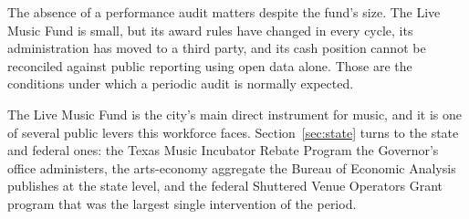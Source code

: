 The absence of a performance audit matters despite the fund's size. The
Live Music Fund is small, but its award rules have
changed in every cycle, its administration has moved to a third party,
and its cash position cannot be reconciled against public reporting
using open data alone. Those are the conditions under which a periodic
audit is normally expected.

The Live Music Fund is the city's main direct instrument for music, and it
is one of several public levers this workforce faces. Section~\ref{sec:state}
turns to the state and federal ones: the Texas Music Incubator Rebate
Program the Governor's office administers, the arts-economy aggregate the
Bureau of Economic Analysis publishes at the state level, and the federal
Shuttered Venue Operators Grant program that was the largest single
intervention of the period.
